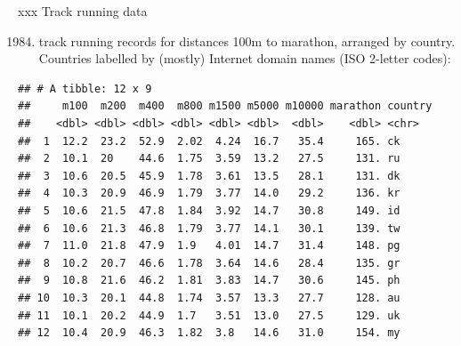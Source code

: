 \documentclass[ignorenonframetext,]{beamer}
\newenvironment{Shaded}{\begin{snugshade}}{\end{snugshade}}
\newcommand{\DecValTok}[1]{\textcolor[rgb]{0.00,0.00,0.81}{#1}}
\newcommand{\KeywordTok}[1]{\textcolor[rgb]{0.13,0.29,0.53}{\textbf{#1}}}
\newcommand{\NormalTok}[1]{#1}
\newcommand{\OperatorTok}[1]{\textcolor[rgb]{0.81,0.36,0.00}{\textbf{#1}}}
\newcommand{\StringTok}[1]{\textcolor[rgb]{0.31,0.60,0.02}{#1}}
\providecommand{\tightlist}{%
  \setlength{\itemsep}{0pt}\setlength{\parskip}{0pt}}
\begin{document}
\begin{frame}[fragile]{xxx Track running data}
\protect\hypertarget{xxx-track-running-data}{}

\begin{enumerate}
[(1)]
\setcounter{enumi}{1983}
\tightlist
\item
  track running records for distances 100m to marathon, arranged by
  country. Countries labelled by (mostly) Internet domain names (ISO
  2-letter codes):
\end{enumerate}

\begin{Shaded}
\end{Shaded}

\begin{verbatim}
## # A tibble: 12 x 9
##     m100  m200  m400  m800 m1500 m5000 m10000 marathon country
##    <dbl> <dbl> <dbl> <dbl> <dbl> <dbl>  <dbl>    <dbl> <chr>  
##  1  12.2  23.2  52.9  2.02  4.24  16.7   35.4     165. ck     
##  2  10.1  20    44.6  1.75  3.59  13.2   27.5     131. ru     
##  3  10.6  20.5  45.9  1.78  3.61  13.5   28.1     131. dk     
##  4  10.3  20.9  46.9  1.79  3.77  14.0   29.2     136. kr     
##  5  10.6  21.5  47.8  1.84  3.92  14.7   30.8     149. id     
##  6  10.6  21.3  46.8  1.79  3.77  14.1   30.1     139. tw     
##  7  11.0  21.8  47.9  1.9   4.01  14.7   31.4     148. pg     
##  8  10.2  20.7  46.6  1.78  3.64  14.6   28.4     135. gr     
##  9  10.8  21.6  46.2  1.81  3.83  14.7   30.6     145. ph     
## 10  10.3  20.1  44.8  1.74  3.57  13.3   27.7     128. au     
## 11  10.1  20.2  44.9  1.7   3.51  13.0   27.5     129. uk     
## 12  10.4  20.9  46.3  1.82  3.8   14.6   31.0     154. my
\end{verbatim}

\end{frame}
\end{document}
